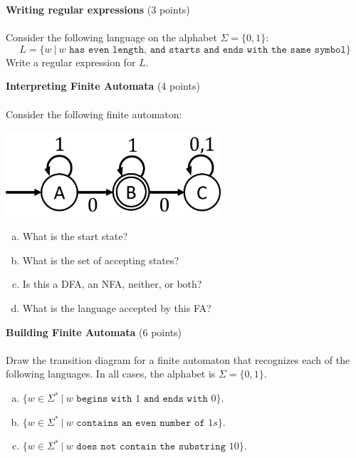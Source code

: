 \documentclass[12pt]{article}
\newenvironment{question}[2][Question]{\begin{trivlist}
\item[\hskip \labelsep {\bfseries #1}\hskip \labelsep {\bfseries #2.}]}{\end{trivlist}}
\begin{document}
\begin{question}{3}\textbf{Writing regular expressions} (3 points)\\\\
Consider the following language on the alphabet $\Sigma = \{0,1\}$:
\[L = \{w \ | \ w \texttt{ has even length, and starts and ends with the same symbol}\}\]
Write a regular expression for $L$.
\end{question}

\clearpage
\begin{question}{4}\textbf{Interpreting  Finite Automata} (4 points)\\\\
Consider the following finite automaton:
\begin{center}
	\includegraphics[width=0.6\textwidth]{q4.png}
\end{center}
\begin{enumerate}[(a)]
	\item What is the start state?\vspace{7em}
	\item What is the set of accepting states?\vspace{7em}
	\item Is this a DFA, an NFA, neither, or both?\vspace{7em}
	\item What is the language accepted by this FA?\vspace{7em}
\end{enumerate}
\end{question}

\clearpage
\begin{question}{5}\textbf{Building Finite Automata} (6 points)\\\\
Draw the transition diagram for a finite automaton that recognizes each of the following languages. In all cases, the alphabet is $\Sigma = \{0,1\}$.
\begin{enumerate}[(a)]
	\item $\{ w \in \Sigma^* \ | \ w \texttt{ begins with } 1 \texttt{ and ends with } 0 \}$.\vspace{13em}

	\item $\{ w \in \Sigma^* \ | \ w \texttt{ contains an even number of } 1s \}$.\vspace{13em}
	
	\item $\{ w \in \Sigma^* \ | \ w \texttt{ does not contain the substring } 10 \}$.
	
\end{enumerate}
\end{question}
\end{document}
